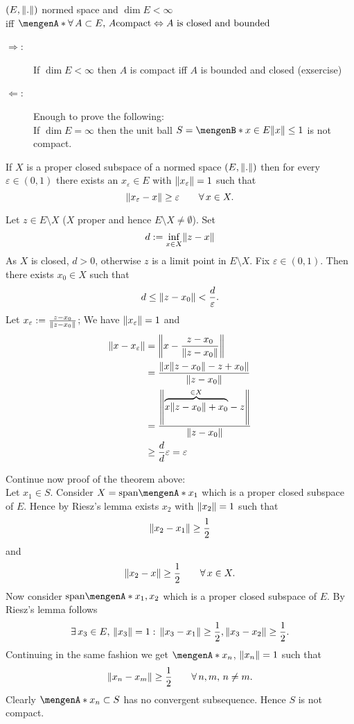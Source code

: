 \begin{theorem}
	$(E,\norm{.})$ normed space and $\dim E < \infty$ \\ iff $\set{\forall\, A \subset E,\,A \text{compact} \Leftrightarrow A \text{ is closed and bounded}}$
\end{theorem}
\begin{beweis}
	\begin{description}
		\item[$\Rightarrow$:]If $\dim E < \infty$ then $A$ is compact iff $A$ is bounded and closed (exsercise)
		\item[$\Leftarrow$:]Enough to prove the following: \\
		If $\dim E = \infty$ then the unit ball $S = \set[x \in E]{\norm{x}\leq 1}$ is not compact.
	\end{description}
\begin{lemma*}
	If $X$ is a proper closed subspace of a normed space $(E,\norm{.})$ then for every $\varepsilon \in (0,1)$ there exists an $x_{\varepsilon} \in E$ with $\norm{x_\varepsilon}=1$ such that
	\[
		\norm{x_{\varepsilon}-x} \geq \varepsilon \qquad \forall\, x \in X.
	\]
\end{lemma*}
\begin{beweis}
	Let $z \in E \setminus X$ ($X$ proper and hence $E \setminus X \neq \emptyset$). Set 
	\[
		d:= \inf_{x \in X}\norm{z-x}
	\] As $X$ is closed, $d >0$, otherwise $z$ is a limit point in $E \setminus X$. Fix $\varepsilon \in (0,1)$. Then there exists $x_0 \in X$ such that
	\[
		d \leq \norm{z-x_0} < \frac{d}{\varepsilon}.
	\]
	Let $x_\varepsilon := \frac{z-x_0}{\norm{z-x_0}}$; We have $\norm{x_\varepsilon}=1$ and
	\begin{align*}
		\norm{x- x_\varepsilon} &= \norm{x - \frac{z-x_0}{\norm{z-x_0}}} \\
		&= \frac{\norm{x \norm{z-x_0}-z + x_0}}{\norm{z-x_0}} \\
		&= \frac{\norm{\overset{\in X}{\overbrace{x \norm{z-x_0}+ x_0 }}- z}}{\norm{z-x_0}} \\
		&\geq \frac{d}{d}\varepsilon = \varepsilon
	\end{align*}
\end{beweis}
Continue now proof of the theorem above: \\
Let $x_1 \in S$. Consider $X = \text{span} \set{x_1}$ which is a proper closed subspace of $E$. Hence by Riesz's lemma exists $x_2$ with $\norm{x_2}=1$ such that
\[
	\norm{x_2-x_1} \geq \frac{1}{2} 
\]
and
\[
	\norm{x_2-x} \geq \frac{1}{2} \qquad \forall\, x \in X.
\]
Now consider $\text{span} \set{x_1,x_2}$ which is a proper closed subspace of $E$. By Riesz's lemma follows
\[
	\exists\,x_3 \in E,\, \norm{x_3}=1: \, \norm{x_3-x_1}\geq \frac{1}{2}, \norm{x_3-x_2} \geq \frac{1}{2}.
\]
Continuing in the same fashion we get $\set{x_n}$, $\norm{x_n}=1$ such that 
\[
	\norm{x_n-x_m} \geq \frac{1}{2} \qquad \forall\, n,m,\,n \neq m.
\]
Clearly $\set{x_n} \subset S$ has no convergent subsequence. Hence $S$ is not compact.
\end{beweis}
